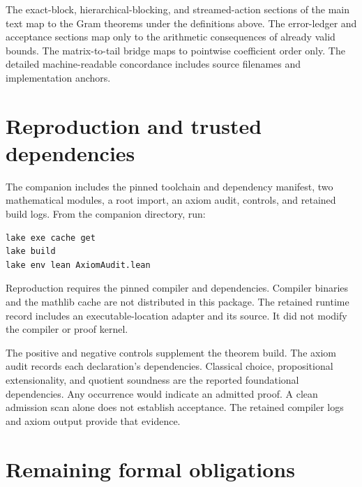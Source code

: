 The exact-block, hierarchical-blocking, and streamed-action sections of the
main text map to the Gram theorems under the definitions above. The
error-ledger and acceptance sections map only to the arithmetic consequences
of already valid bounds. The matrix-to-tail bridge maps to pointwise
coefficient order only. The detailed machine-readable concordance includes
source filenames and implementation anchors.

\section{Reproduction and trusted dependencies}

The companion includes the pinned toolchain and dependency manifest, two
mathematical modules, a root import, an axiom audit, controls, and retained
build logs. From the companion directory, run:
\begin{verbatim}
lake exe cache get
lake build
lake env lean AxiomAudit.lean
\end{verbatim}
Reproduction requires the pinned compiler and dependencies. Compiler
binaries and the mathlib cache are not distributed in this package.
The retained runtime record includes an executable-location adapter and its
source. It did not modify the compiler or proof kernel.

The positive and negative controls supplement the theorem build. The
axiom audit records each declaration's dependencies. Classical choice,
propositional extensionality, and quotient soundness are the reported
foundational dependencies. Any  occurrence would indicate an
admitted proof. A clean admission scan alone does not establish acceptance.
The retained compiler logs and axiom output provide that evidence.

\section{Remaining formal obligations}

